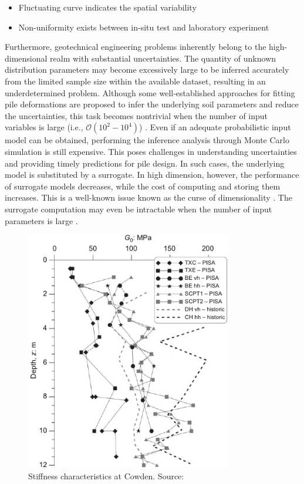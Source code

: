 
\begin{itemize}[left=0pt]

    \item Fluctuating curve indicates the spatial  variability
    \item Non-uniformity exists between in-situ test and laboratory experiment

\end{itemize}
\vspace{0.2cm}

Furthermore, geotechnical engineering problems inherently belong to the high-dimensional realm with substantial uncertainties. The quantity of unknown distribution parameters may become excessively large to be inferred accurately from the limited sample size within the available dataset, resulting in an underdetermined problem. Although some well-established approaches for fitting pile deformations are proposed to infer the underlying soil parameters and  reduce the uncertainties, this task becomes nontrivial when the number of input variables is large (i.e., $\mathcal{O}(10^2-10^4)$) \citep{lataniotis2019}. 
Even if an adequate probabilistic input model can be obtained, performing the inference analysis  through Monte Carlo simulation is still expensive. This poses challenges in understanding uncertainties and providing timely predictions for pile design.
 In such cases, the underlying model is substituted by a surrogate. In high dimension, however,
the performance of surrogate models decreases, while the cost of computing and storing them increases. This is a well-known issue known as the curse
of dimensionality \citep{verleysen2005}. The surrogate computation
may even be intractable when the number of input parameters is large \citep{lataniotis2019}.


\begin{figure}[htbp]
    \center
    \includegraphics[width = 90mm]{Figures/figure-Cowden.pdf}
    \caption{Stiffness characteristics at Cowden. Source: \protect\cite{zdravkovic2020}}
    \label{fig: Cowden_cpt}
\end{figure}

